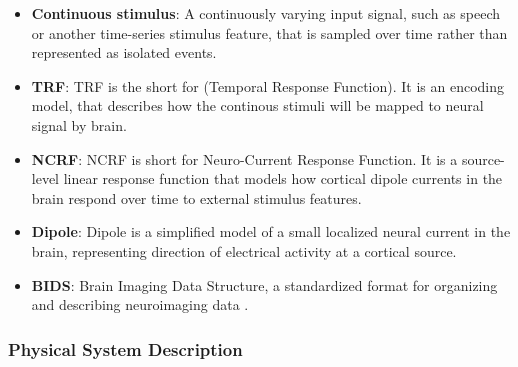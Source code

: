 \documentclass[12pt]{article}
\begin{document}
\begin{itemize}

  \item \textbf{Continuous stimulus}: A continuously varying input signal, such as speech or another time-series stimulus feature, that is sampled over time rather than represented as isolated events.
  \item \textbf{TRF}: TRF is the short for (Temporal Response Function). It is an encoding model, that describes
    how the continous stimuli will be mapped to neural signal by brain.
  \item \textbf{NCRF}: NCRF is short for Neuro-Current Response Function. It is a source-level linear response function that models how cortical dipole currents in the brain respond over time to external stimulus features.
  \item \textbf{Dipole}: Dipole is a simplified model of a small localized neural current in the brain, representing  direction of electrical activity at a cortical source.
  \item \textbf{BIDS}: Brain Imaging Data Structure, a standardized format for organizing and describing neuroimaging data \citep{gorgolewski2016bids}.
\end{itemize}

\subsubsection{Physical System Description} \label{sec-phySystDescrip}


\end{document}
